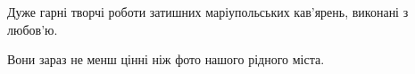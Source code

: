  
 
 
 
 

\qqSecCmt


Дуже гарні творчі роботи затишних маріупольських кав'ярень, виконані з любов'ю.

Вони зараз не менш цінні ніж фото нашого рідного міста.
